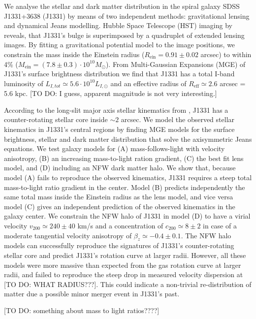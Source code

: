 We analyse the stellar and dark matter distribution in the spiral galaxy SDSS J1331+3638 (J1331) by means of two independent methods: gravitational lensing and dynamical Jeans modelling. Hubble Space Telescope (HST) imaging by \citet{SWELLSI} reveals, that J1331's bulge is superimposed by a quadruplet of extended lensing images. By fitting a gravitational potential model to the image positions, we constrain the mass inside the Einstein radius ($R_\text{ein}=0.91\pm0.02$ arcsec) to within 4\% ($M_\text{ein} = (7.8\pm0.3) \cdot 10^{10} M_\odot$). From Multi-Gaussian Expansions (MGE) of J1331's surface brightness distribution we find that J1331 has a total I-band luminosity of $L_{I,tot} \simeq 5.6 \cdot 10^{10}L_{I,\odot}$ and an effective radius of $R_\text{eff} \simeq 2.6$ arcsec = 5.6 kpc. [TO DO: I guess, apparent magnitude is not very interesting.]

According to the long-slit major axis stellar kinematics from \citet{SWELLSV}, J1331 has a counter-rotating stellar core inside $\sim 2$ arcsec. We model the observed stellar kinematics in J1331's central regions by finding MGE models for the surface brightness, stellar and dark matter distribution that solve the axisymmetric Jeans equations. We test galaxy models for (A) mass-follows-light with velocity anisotropy, (B) an increasing mass-to-light ration gradient, (C) the best fit lens model, and (D) including an NFW dark matter halo. We show that, because model (A) fails to reproduce the observed kinematics, J1331 requires a steep total mass-to-light ratio gradient in the center. Model (B) predicts independently the same total mass inside the Einstein radius as the lens model, and vice versa model (C) gives an independent prediction of the observed kinematics in the galaxy center. We constrain the NFW halo of J1331 in model (D) to have a virial velocity $v_{200} \simeq 240 \pm 40$ km/s and a concentration of $c_{200} \simeq 8 \pm 2$ in case of a moderate tangential velocity anisotropy of $\beta_z \simeq −0.4 \pm 0.1$. The NFW halo models can successfully reproduce the signatures of J1331's counter-rotating stellar core and predict J1331's rotation curve at larger radii. However, all these models were more massive than expected from the gas rotation curve at larger radii, and failed to reproduce the steep drop in measured velocity dispersion at [TO DO: WHAT RADIUS???]. This could indicate a non-trivial re-distribution of matter due a possible minor merger event in J1331's past.

[TO DO: something about mass to light ratios????]